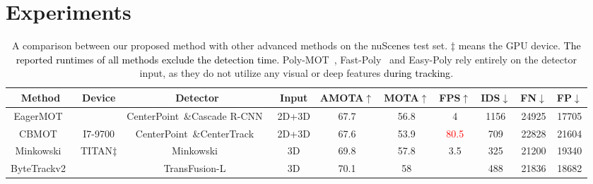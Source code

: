 \section{Experiments}
\label{sec: experiments}

\begin{table*}
        \caption{A comparison between our proposed method with other advanced methods on the nuScenes test set.
        $\ddagger$ means the GPU device.
        \textcolor{black}{The reported runtimes of all methods exclude the detection time.}
        Poly-MOT~\cite{li2023poly}, Fast-Poly~\cite{li2024fast} and Easy-Poly rely entirely on the detector input, as they do not utilize any visual or deep features \textcolor{black}{during tracking}.}
        \label{table:nu_test}
        \setlength{\tabcolsep}{1.6mm}
        {
        \begin{tabular}{cccc|ccc|ccc}
        \toprule
        \multicolumn{1}{c}{\textbf{Method}} & \textbf{Device} & \textbf{Detector} & \textbf{Input} & \textbf{AMOTA}$\uparrow$ & \textbf{MOTA}$\uparrow$ & \textbf{FPS}$\uparrow$ & \textbf{IDS}$\downarrow$ & \textbf{FN}$\downarrow$ & \textbf{FP}$\downarrow$ \\ \midrule
                                     EagerMOT~\cite{kim2021eagermot}               & \textbf{\text{--}}       & CenterPoint~\cite{yin2021center}\&Cascade R-CNN~\cite{cai2018cascade}         & 2D+3D       & 67.7      & 56.8     & 4    & 1156    & 24925   & 17705   \\
                                   CBMOT~\cite{benbarka2021score}     & I7-9700          & CenterPoint~\cite{yin2021center}\&CenterTrack~\cite{zhou2020tracking}          & 2D+3D         & 67.6      & 53.9      & \textcolor{red}{80.5}    & 709    & 22828   & 21604   \\
                                   Minkowski~\cite{gwak2022minkowski} & TITAN$\ddagger$  & Minkowski~\cite{gwak2022minkowski}         & 3D      & 69.8      & 57.8     & 3.5    & 325    & 21200   & 19340   \\
                                   ByteTrackv2~\cite{zhang2023bytetrackv2} & \textbf{\text{--}}       & TransFusion-L~\cite{bai2022transfusion}         & 3D      & 70.1      & 58     & \textbf{\text{--}}    & 488    & 21836   & 18682   \\

\end{tabular}}
\end{table*}
